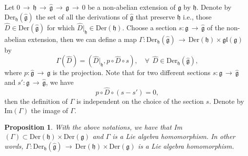 \documentclass[12pt]{amsart}
\newtheorem{pro}[thm]{Proposition}
\newcommand{\lon }{\,\rightarrow\,}
\newcommand{\g}{\mathfrak g}
\newcommand{\h}{\mathfrak h}
\newcommand{\Der}{\mathrm{Der}}
\newcommand{\gl}{\mathfrak {gl}}
\begin{document}
Let $0\lon\h\lon\hat{\g}\lon\g\lon0$ be a non-abelian extension of $\g$ by $\h$. Denote by $\Der_{\h}(\hat{\g})$ the set of all the derivations of $\hat{\g}$ that preserve $\h$ i.e., those $\hat{D}\in\Der(\hat{\g})$ for which $\hat{D}|_\h\in\Der(\h)$. 
Choose a section $s:\g\lon\hat{\g}$ of the non-abelian extension, then we can define a map
$\Gamma:\Der_{\h}(\hat{\g})\lon\Der(\h)\times\gl(\g)$ by
$$
\Gamma(\hat{D})=(\hat{D}|_\h, p\circ \hat{D}\circ s), \quad \forall~~\hat{D}\in\Der_{\h}(\hat{\g}),
$$
where $p:\hat{\g}\lon\g$ is the projection. Note that for two different sections $s:\g\lon\hat{\g}$ and $s':\g\lon\hat{\g}$, we have 
$$
p\circ\hat{D}\circ(s-s')=0,
$$
then the definition of $\Gamma$ is independent on the choice of the section $s$. Denote by {\rm Im}$(\Gamma)$ the image of $\Gamma$.
\begin{pro}
With the above notations, we have that {\rm Im}$(\Gamma)\subset\Der(\h)\times\Der(\g)$ and $\Gamma$ is a Lie algebra homomorphism. In other words, $\Gamma:\Der_{\h}(\hat{\g})\lon\Der(\h)\times\Der(\g)$ is a Lie algebra homomorphism.
\end{pro}
\end{document}
